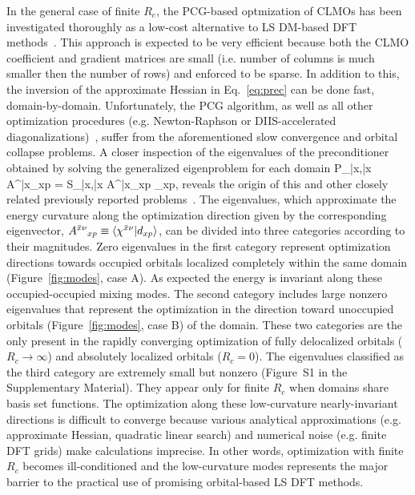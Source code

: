 \documentclass[10pt,amsmath,twocolumn,aps,prl,superscriptaddress,floatfix]{revtex4-1}
\begin{document}
In the general case of finite $R_c$, the PCG-based optmization of CLMOs has been investigated thoroughly as a low-cost alternative to LS DM-based DFT methods~\cite{mauri1993orbital, kim1995total, ordejon1995linear, fattebert2004linear, fattebert2006linear, burger2008linear, peng2013effective, khaliullin2013efficient}. 
This approach is expected to be very efficient because both the CLMO coefficient and gradient matrices are small (i.e. number of columns is much smaller then the number of rows) and enforced to be sparse. 
In addition to this, the inversion of the approximate Hessian in Eq.~\ref{eq:prec} can be done fast, domain-by-domain. 
%
Unfortunately, the PCG algorithm, as well as all other optimization procedures (e.g. Newton-Raphson or DIIS-accelerated diagonalizations)~\cite{stoll1980use}, suffer from the aforementioned slow convergence and orbital collapse problems. 
%
A closer inspection of the eigenvalues of the preconditioner obtained by solving the generalized eigenproblem for each domain 
%
\bea
P_{\bar{x}\mu,\bar{x}\nu} {A^{\bar{x}\nu}}_{xp} =  S_{\bar{x}\mu,\bar{x}\lambda} {A^{\bar{x}\lambda}}_{xp} \Lambda_{xp},
\label{eq:gev}
\eea
%
reveals the origin of this and other closely related previously reported problems~\cite{goedecker1999linear}. 
The eigenvalues, which approximate the energy curvature along the optimization direction  given by the corresponding eigenvector, ${A^{\bar{x}\nu}}_{xp} \equiv \langle \chi^{\bar{x}\nu} \vert d_{xp} \rangle$, can be divided into three categories according to their magnitudes. 
Zero eigenvalues in the first category represent optimization directions towards occupied orbitals localized completely within the same domain (Figure~\ref{fig:modes}, case A). 
As expected the energy is invariant along these occupied-occupied mixing modes. 
The second category includes large nonzero eigenvalues that represent the optimization in the direction toward unoccupied orbitals (Figure~\ref{fig:modes}, case B) of the domain. 
These two categories are the only present in the rapidly converging optimization of fully delocalized orbitals ($R_c \rightarrow \infty$) and absolutely localized orbitals ($R_c = 0$). 
The eigenvalues classified as the third category are extremely small but nonzero (Figure~S1 in the Supplementary Material). 
They appear only for finite $R_c$ when domains share basis set functions. 
The optimization along these low-curvature nearly-invariant directions is difficult to converge because various analytical approximations (e.g. approximate Hessian, quadratic linear search) and numerical noise (e.g. finite DFT grids) make calculations  imprecise. 
In other words, optimization with finite $R_c$ becomes ill-conditioned and the low-curvature modes represents the major barrier to the practical use of promising orbital-based LS DFT methods. 
\end{document}
